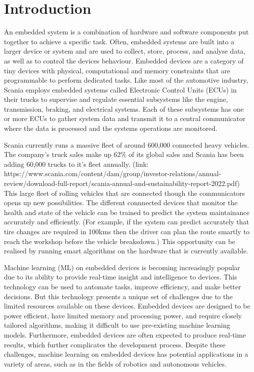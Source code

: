 \part{Introduction}

An embedded system is a combination of hardware and software components put together to achieve a specific task. Often, embedded systems are built into a larger device or system and are used to collect, store, process, and analyse data, as well as to control the device\textquotesingle s behaviour. Embedded devices are a category of tiny devices with physical, computational and memory constraints that are programmable to perform dedicated tasks.
Like most of the automotive industry, Scania employs embedded systems called Electronic Control Units (ECUs) in their trucks to supervise and regulate essential subsystems like the engine, transmission, braking, and electrical systems. Each of these subsystems has one or more ECUs to gather system data and transmit it to a central communicator where the data is processed and the systems operations are monitored.

Scania currently runs a massive fleet of around 600,000 connected heavy vehicles. The company's truck sales make up 62\% of its global sales and Scania has been adding 60,000 trucks to it's fleet annually. (link: https://www.scania.com/content/dam/group/investor-relations/annual-review/download-full-report/scania-annual-and-sustainability-report-2022.pdf) This large fleet of rolling vehicles that are connected though the communicators opens up new possibilities. The different connnected devices that monitor the health and state of the vehicle can be trained to predict the system maintainance accurately and efficiently. (For example, if the system can predict accurately that tire changes are required in 100kms then the driver can plan the route smartly to reach the workshop before the vehicle breaksdown.) This opportunity can be realised by running smart algorithms on the hardware that is currently available.

Machine learning (ML) on embedded devices is becoming increasingly popular due to its ability to provide real-time insight and intelligence to devices. This technology can be used to automate tasks, improve efficiency, and make better decisions. But this technology presents a unique set of challenges due to the limited resources available on these devices. Embedded devices are designed to be power efficient, have limited memory and processing power, and require closely tailored algorithms, making it difficult to use pre-existing machine learning models. Furthermore, embedded devices are often expected to produce real-time results, which further complicates the development process. Despite these challenges, machine learning on embedded devices has potential applications in a variety of areas, such as in the fields of robotics and autonomous vehicles.

